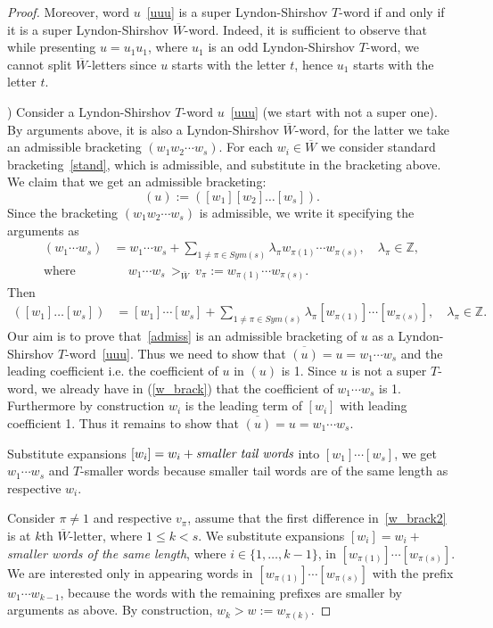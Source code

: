 \documentclass[12pt, reqno]{amsart}
\theoremstyle{remark}
\theoremstyle{definition}
\numberwithin{equation}{section}
\newcommand{\Z}{\mathbb{Z}}
\begin{document}
\begin{proof}
Moreover, word $u$~\eqref{uuu} is a super Lyndon-Shirshov $T$-word if and only if it is a super Lyndon-Shirshov $\overline W$-word. 
Indeed, it is sufficient to observe that while presenting $u=u_1u_1$, where $u_1$ is  an odd Lyndon-Shirshov $T$-word, we cannot split $\overline W$-letters  since $u$ starts with the letter $t$, hence $u_1$ starts with the letter $t$.

) Consider a Lyndon-Shirshov $T$-word $u$~\eqref{uuu} (we start with not a super one). By arguments above, it is also a Lyndon-Shirshov $\overline W$-word, for the latter
we take an admissible bracketing $(w_1w_2\cdots w_s)$. 
For each $w_i\in \overline W$ we consider standard bracketing~\eqref{stand}, which is admissible, and substitute in the bracketing above.
We claim that we get an admissible bracketing:
\begin{equation}    \label{admiss}
(u):= ([w_1][w_2]\ldots [w_s]).
\end{equation}
Since the bracketing $(w_1w_2\cdots w_s)$ is admissible, we write it specifying the arguments as
\begin{align}\label{w_brack}
 (w_1\cdots w_s) &=w_1\cdots w_s+\sum_{1\ne \pi \in Sym(s)} \lambda_\pi w_{\pi(1)}\cdots w_{\pi(s)},\quad \lambda_\pi\in \Z, \\
\text{where}&\quad \ w_1\cdots w_s \,>_{\overline W}\, v_\pi:=  w_{\pi(1)}\cdots w_{\pi(s)}. \label{w_brack2}
\end{align}
Then 
\begin{align} ([w_1]\ldots [w_s]) &=[w_1]\cdots [w_s]+\sum_{1\ne \pi \in Sym(s)} \lambda_\pi [w_{\pi(1)}]\cdots [w_{\pi(s)}],\quad \lambda_\pi\in \Z.
\end{align}
Our aim is to prove that~\eqref{admiss} is an admissible bracketing of $u$ as a Lyndon-Shirshov $T$-word~\eqref{uuu}. Thus we need to show that $\overline{(u)} = u = w_1 \cdots w_s$ and the leading coefficient i.e. the coefficient of $u$ in $(u)$ is 1. Since $u$ is not a super $T$-word, we already have in (\ref{w_brack}) that the coefficient of $w_1 \cdots w_s$ is 1. Furthermore by construction $w_i$ is the leading term of $[w_i]$ with leading coefficient 1. Thus it remains to show that  $\overline{(u)} = u = w_1 \cdots w_s$. 


Substitute expansions $[w_i]=w_i+\text{\it smaller tail words}$ into  $[w_1]\cdots [w_s]$, 
we get $w_1\cdots w_s$ and $T$-smaller words because smaller tail words are of the same length as respective $w_i$.

Consider $\pi\ne 1$ and respective $v_\pi$, 
assume that the first difference in~\eqref{w_brack2} is at $k$th $\overline W$-letter, where $1\le  k< s$.
We substitute expansions  $[w_i]=w_i+$ {\it smaller words of the same length}, where $i\in\{1,\ldots, k-1\}$, 
in  $[ w_{\pi(1)}]\cdots [w_{\pi(s)}]$. 
We are interested only in appearing words  in $[ w_{\pi(1)}]\cdots [w_{\pi(s)}]$  with the prefix $w_1\cdots w_{k-1}$, because the words with the remaining prefixes are smaller by arguments as above. 
By construction, $w_k> w:=w_{\pi(k)}$. 


\end{proof}
\end{document}

